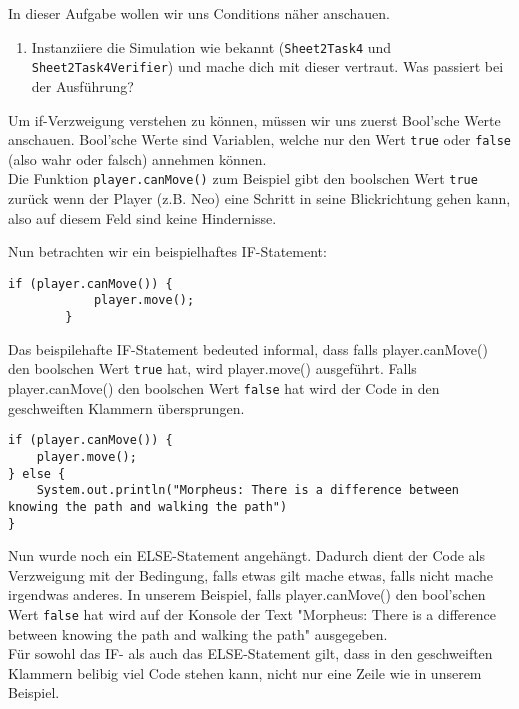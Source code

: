 

In dieser Aufgabe wollen wir uns Conditions näher anschauen.

\begin{enumerate}                           
    \item Instanziiere die Simulation wie bekannt (\lstinline{Sheet2Task4} und \lstinline{Sheet2Task4Verifier}) und mache dich mit dieser vertraut.
        Was passiert bei der Ausführung?
\end{enumerate}

\begin{Infobox}
    Um if-Verzweigung verstehen zu können, müssen wir uns zuerst Bool'sche Werte anschauen. Bool'sche Werte sind Variablen, welche nur den Wert \lstinline{true} oder \lstinline{false} (also wahr oder falsch) annehmen können. \\

    Die Funktion \lstinline{player.canMove()} zum Beispiel gibt den boolschen Wert \lstinline{true} zurück wenn der Player (z.B. Neo) eine Schritt in seine Blickrichtung gehen kann, also auf diesem Feld sind keine Hindernisse. 
    
\end{Infobox}

\begin{Infobox}[IF-Verzweigung]
    Nun betrachten wir ein beispielhaftes IF-Statement:

    \begin{lstlisting}[breaklines=true, numbers=none]
        if (player.canMove()) {
            player.move();
        } 
    \end{lstlisting}

    Das beispilehafte IF-Statement bedeuted informal, dass falls player.canMove() den boolschen Wert \lstinline{true} hat, wird player.move() ausgeführt. Falls player.canMove() den boolschen Wert \lstinline{false} hat wird der Code in den geschweiften Klammern übersprungen.

    \begin{lstlisting}[breaklines=true, numbers=none]
if (player.canMove()) {
    player.move();
} else {
    System.out.println("Morpheus: There is a difference between knowing the path and walking the path")
}
    \end{lstlisting}

    Nun wurde noch ein ELSE-Statement angehängt. Dadurch dient der Code als Verzweigung mit der Bedingung, falls etwas gilt mache etwas, falls nicht mache irgendwas anderes. In unserem Beispiel, falls player.canMove() den bool'schen Wert \lstinline{false} hat wird auf der Konsole der Text "Morpheus: There is a difference between knowing the path and walking the path" ausgegeben.\\

    Für sowohl das IF- als auch das ELSE-Statement gilt, dass in den geschweiften Klammern belibig viel Code stehen kann, nicht nur eine Zeile wie in unserem Beispiel.
\end{Infobox}


